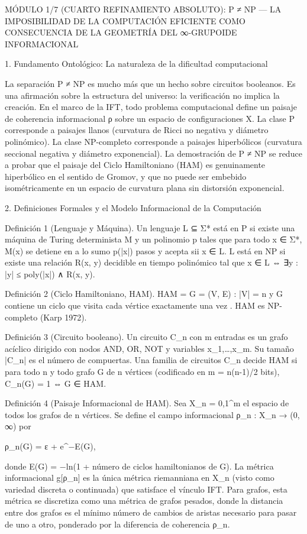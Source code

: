 \documentclass[12pt,a4paper]{book}
\begin{document}
MÓDULO 1/7 (CUARTO REFINAMIENTO ABSOLUTO): P ≠ NP — LA IMPOSIBILIDAD DE LA COMPUTACIÓN EFICIENTE COMO CONSECUENCIA DE LA GEOMETRÍA DEL ∞-GRUPOIDE INFORMACIONAL

1. Fundamento Ontológico: La naturaleza de la dificultad computacional

La separación P ≠ NP es mucho más que un hecho sobre circuitos booleanos. Es una afirmación sobre la estructura del universo: la verificación no implica la creación. En el marco de la IFT, todo problema computacional define un paisaje de coherencia informacional ρ sobre un espacio de configuraciones X. La clase P corresponde a paisajes llanos (curvatura de Ricci no negativa y diámetro polinómico). La clase NP-completo corresponde a paisajes hiperbólicos (curvatura seccional negativa y diámetro exponencial). La demostración de P ≠ NP se reduce a probar que el paisaje del Ciclo Hamiltoniano (HAM) es genuinamente hiperbólico en el sentido de Gromov, y que no puede ser embebido isométricamente en un espacio de curvatura plana sin distorsión exponencial.

2. Definiciones Formales y el Modelo Informacional de la Computación

Definición 1 (Lenguaje y Máquina). Un lenguaje L ⊆ Σ* está en P si existe una máquina de Turing determinista M y un polinomio p tales que para todo x ∈ Σ*, M(x) se detiene en a lo sumo p(|x|) pasos y acepta sii x ∈ L. L está en NP si existe una relación R(x, y) decidible en tiempo polinómico tal que x ∈ L ⇔ ∃y : |y| ≤ poly(|x|) ∧ R(x, y).

Definición 2 (Ciclo Hamiltoniano, HAM). HAM = { G = (V, E) : |V| = n y G contiene un ciclo que visita cada vértice exactamente una vez }. HAM es NP-completo (Karp 1972).

Definición 3 (Circuito booleano). Un circuito C_n con m entradas es un grafo acíclico dirigido con nodos AND, OR, NOT y variables x_1,…,x_m. Su tamaño |C_n| es el número de compuertas. Una familia de circuitos {C_n} decide HAM si para todo n y todo grafo G de n vértices (codificado en m = n(n-1)/2 bits), C_n(G) = 1 ⇔ G ∈ HAM.

Definición 4 (Paisaje Informacional de HAM). Sea X_n = {0,1}^m el espacio de todos los grafos de n vértices. Se define el campo informacional ρ_n : X_n → (0, ∞) por

ρ_n(G) = ε + e^{−E(G)},

donde E(G) = −ln(1 + número de ciclos hamiltonianos de G). La métrica informacional g[ρ_n] es la única métrica riemanniana en X_n (visto como variedad discreta o continuada) que satisface el vínculo IFT. Para grafos, esta métrica se discretiza como una métrica de grafos pesados, donde la distancia entre dos grafos es el mínimo número de cambios de aristas necesario para pasar de uno a otro, ponderado por la diferencia de coherencia ρ_n.
\end{document}
